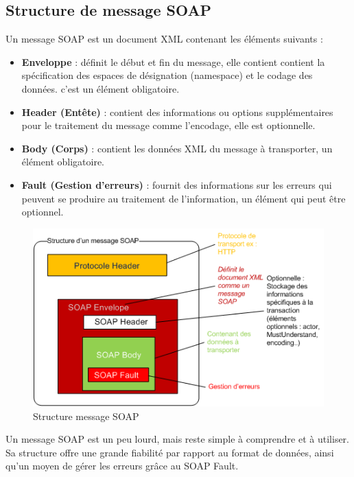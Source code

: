 \subsection{Structure de message SOAP}
Un message SOAP est un document XML contenant les éléments suivants \cite{refTutorialPointsSOAP} : 
\begin{itemize}
	\item \textbf{Enveloppe} : définit le début et fin du message, elle contient contient la spécification des espaces de désignation (namespace) et le codage des données. c'est un élément obligatoire.
	\item \textbf{Header (Entête)} : contient des informations ou options supplémentaires pour le traitement du message comme l'encodage, elle est optionnelle.
	\item \textbf{Body (Corps)} : contient les données XML du message à transporter, un élément obligatoire.
	\item \textbf{Fault (Gestion d'erreurs)} : fournit des informations sur les erreurs qui peuvent se produire au traitement de l'information, un élément qui peut être optionnel.
\end{itemize}
\begin{figure}[h]
	\begin{center}
		\includegraphics[scale=1]{img/soapmessagebody.png}
	\end{center}	
	\label{Structure message SOAP}
	\caption{Structure message SOAP}		
	\centering
\end{figure}			
Un message SOAP est un peu lourd, mais reste simple à comprendre et à utiliser. Sa structure offre une grande fiabilité par rapport au format de données, ainsi qu'un moyen de gérer les erreurs grâce au SOAP Fault.

